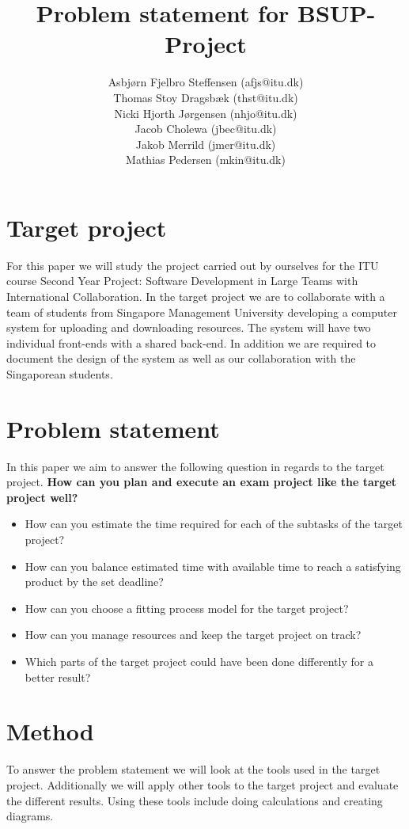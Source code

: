 \documentclass[]{article}
\title{Problem statement for BSUP-Project}
\author{Asbj\o rn Fjelbro Steffensen (afjs@itu.dk)\\ Thomas Stoy Dragsb\ae k (thst@itu.dk)\\ Nicki Hjorth J\o rgensen (nhjo@itu.dk)\\ Jacob Cholewa (jbec@itu.dk)\\ Jakob Merrild (jmer@itu.dk)\\ Mathias Pedersen (mkin@itu.dk)}
\begin{document}
\maketitle

\section*{Target project}
For this paper we will study the project carried out by ourselves for the ITU course 
Second Year Project: Software Development in Large Teams with International Collaboration.
In the target project we are to collaborate with a team of students from Singapore Management University
developing a computer system for uploading and downloading resources. The system will have two
individual front-ends with a shared back-end. In addition we are required to document the design
of the system as well as our collaboration with the Singaporean students.

\section*{Problem statement}
In this paper we aim to answer the following question in regards to the target project.
\newline	
\textbf{How can you plan and execute an exam project like the target project well?}
\begin{itemize}
	\item	How can you estimate the time required for each of the subtasks of the target project?
	\item 	How can you balance estimated time with available time to reach a satisfying product by the set deadline?
	\item 	How can you choose a fitting process model for the target project?
	\item 	How can you manage resources and keep the target project on track?
	\item 	Which parts of the target project could have been done differently for a better result?
\end{itemize}

\section*{Method}
To answer the problem statement we will look at the tools used in the target project. Additionally we will apply other tools to the target project and evaluate the different results. Using these tools include doing calculations and creating diagrams.


\newpage
{}
\end{document}
